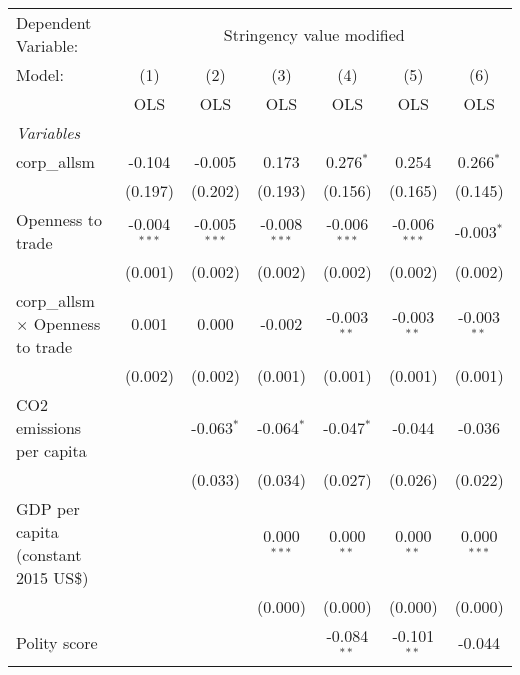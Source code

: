 
\begingroup
\centering
\begin{tabular}{lcccccc}
   \toprule
   Dependent Variable: & \multicolumn{6}{c}{Stringency value modified}\\
   Model:                                   & (1)            & (2)            & (3)            & (4)            & (5)            & (6)\\  
                                            &  OLS           & OLS            & OLS            & OLS            & OLS            & OLS\\  
   \midrule
   \emph{Variables}\\
   corp\_allsm                              & -0.104         & -0.005         & 0.173          & 0.276$^{*}$    & 0.254          & 0.266$^{*}$\\   
                                            & (0.197)        & (0.202)        & (0.193)        & (0.156)        & (0.165)        & (0.145)\\   
   Openness to trade                        & -0.004$^{***}$ & -0.005$^{***}$ & -0.008$^{***}$ & -0.006$^{***}$ & -0.006$^{***}$ & -0.003$^{*}$\\   
                                            & (0.001)        & (0.002)        & (0.002)        & (0.002)        & (0.002)        & (0.002)\\   
   corp\_allsm $\times$ Openness to trade   & 0.001          & 0.000          & -0.002         & -0.003$^{**}$  & -0.003$^{**}$  & -0.003$^{**}$\\   
                                            & (0.002)        & (0.002)        & (0.001)        & (0.001)        & (0.001)        & (0.001)\\   
   CO2 emissions per capita                 &                & -0.063$^{*}$   & -0.064$^{*}$   & -0.047$^{*}$   & -0.044         & -0.036\\   
                                            &                & (0.033)        & (0.034)        & (0.027)        & (0.026)        & (0.022)\\   
   GDP per capita (constant 2015 US\$)      &                &                & 0.000$^{***}$  & 0.000$^{**}$   & 0.000$^{**}$   & 0.000$^{***}$\\   
                                            &                &                & (0.000)        & (0.000)        & (0.000)        & (0.000)\\   
   Polity score                             &                &                &                & -0.084$^{**}$  & -0.101$^{**}$  & -0.044\\   

\end{tabular}
